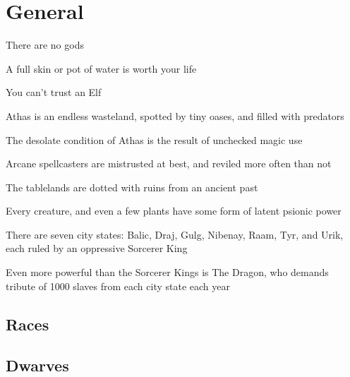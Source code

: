 \section{General}
\begin{description}
    \item There are no gods
    \item A full skin or pot of water is worth your life
    \item You can’t trust an Elf
    \item Athas is an endless wasteland, spotted by tiny oases, and filled with predators
    \item The desolate condition of Athas is the result of unchecked magic use
    \item Arcane spellcasters are mistrusted at best, and reviled more often than not
    \item The tablelands are dotted with ruins from an ancient past
    \item Every creature, and even a few plants have some form of latent psionic power
    \item There are seven city states: Balic, Draj, Gulg, Nibenay, Raam, Tyr, and Urik, each ruled by an oppressive Sorcerer King
    \item Even more powerful than the Sorcerer Kings is The Dragon, who demands tribute of 1000 slaves from each city state each year
\end{description}

\subsection{Races}
\subsection{Dwarves}

